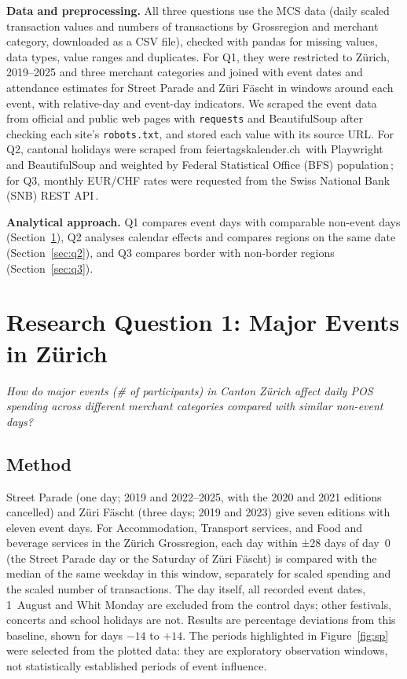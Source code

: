 \documentclass[10pt]{article}
\newcommand{\researchquestion}[1]{%
  \begin{tcolorbox}[blank,left=3.4mm,top=0.6mm,bottom=0.6mm,borderline west={1.8pt}{0pt}{bluerule}]
  {\itshape\color{navy}#1}
  \end{tcolorbox}}
\let\plainsection\section
\renewcommand{\section}{\Needspace*{6\baselineskip}\plainsection}
\begin{document}
\textbf{Data and preprocessing.} All three questions use the MCS data (daily scaled transaction values and numbers of transactions by Grossregion and merchant category, downloaded as a CSV file), checked with pandas for missing values, data types, value ranges and duplicates. For Q1, they were restricted to Zürich, 2019--2025 and three merchant categories and joined with event dates and attendance estimates for Street Parade and Züri Fäscht in windows around each event, with relative-day and event-day indicators. We scraped the event data from official and public web pages with \texttt{requests} and BeautifulSoup after checking each site's \texttt{robots.txt}, and stored each value with its source URL. For Q2, cantonal holidays were scraped from feiertagskalender.ch\,\cite{feiertage} with Playwright and BeautifulSoup and weighted by Federal Statistical Office (BFS) population\,\cite{bfs}; for Q3, monthly EUR/CHF rates were requested from the Swiss National Bank (SNB) REST API\,\cite{snb}.

\textbf{Analytical approach.} Q1 compares event days with comparable non-event days (Section~\ref{sec:q1}), Q2 analyses calendar effects and compares regions on the same date (Section~\ref{sec:q2}), and Q3 compares border with non-border regions (Section~\ref{sec:q3}).

\section{Research Question 1: Major Events in Zürich}
\label{sec:q1}
\researchquestion{How do major events (\# of participants) in Canton Zürich affect daily POS spending across different merchant categories compared with similar non-event days?}

\subsection{Method}
Street Parade (one day; 2019 and 2022--2025, with the 2020 and 2021 editions cancelled) and Züri Fäscht (three days; 2019 and 2023) give seven editions with eleven event days. For Accommodation, Transport services, and Food and beverage services in the Zürich Grossregion, each day within ±28 days of day~0 (the Street Parade day or the Saturday of Züri Fäscht) is compared with the median of the same weekday in this window, separately for scaled spending and the scaled number of transactions. The day itself, all recorded event dates, 1~August and Whit Monday are excluded from the control days; other festivals, concerts and school holidays are not. Results are percentage deviations from this baseline, shown for days $-14$ to $+14$. The periods highlighted in Figure~\ref{fig:sp} were selected from the plotted data: they are exploratory observation windows, not statistically established periods of event influence.
\end{document}
